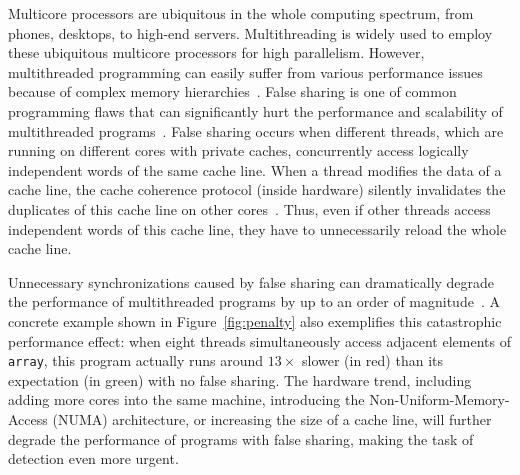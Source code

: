 Multicore processors are ubiquitous in the whole computing spectrum, from phones, desktops, to high-end servers. Multithreading is widely used to employ these ubiquitous multicore processors for high parallelism. However, multithreaded programming can easily suffer from various performance issues because of complex memory hierarchies~\cite{ibs-sc,ibs-sc2,Dramon}. False sharing is one of common programming flaws that can significantly hurt the performance and scalability of multithreaded programs~\cite{falseshare:effect}. False sharing occurs when different threads, which are running on different cores with private caches, concurrently access logically independent words of the same cache line. When a thread modifies the data of a cache line, the cache coherence protocol (inside hardware) silently invalidates the duplicates of this cache line on other cores~\cite{MESI}. Thus, even if other threads access independent words of this cache line, they have to unnecessarily reload the whole cache line. 

Unnecessary synchronizations caused by false sharing can dramatically degrade the performance of multithreaded programs by up to an order of magnitude~\cite{falseshare:effect}. A concrete example shown in Figure~\ref{fig:penalty} also exemplifies this catastrophic performance effect: when eight threads simultaneously access adjacent elements of {\tt array}, this program actually runs around $13\times$ slower (in red) than its expectation (in green) with no false sharing. The hardware trend, including adding more cores into the same machine, introducing the Non-Uniform-Memory-Access (NUMA) architecture, or increasing the size of a cache line, will further degrade the performance of programs with false sharing, making the task of detection even more urgent. 

